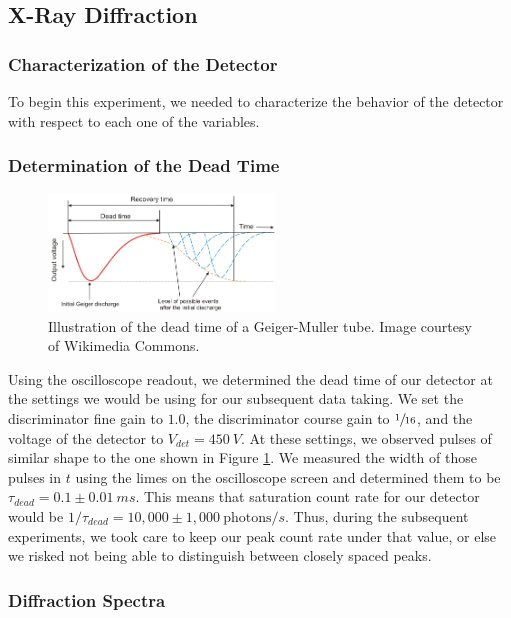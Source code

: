 \documentclass[%
 reprint,
 amsmath,amssymb,
 aps,
 pra,
]{revtex4-1}
\begin{document}
\subsection{X-Ray Diffraction}

\subsubsection{Characterization of the Detector}

To begin this experiment, we needed to characterize the behavior of the detector with respect to each one of the variables.

\subsubsection{Determination of the Dead Time}

\begin{figure}[H]
	\centering
	\includegraphics[width=6cm]{dead_time.png}
	\caption{Illustration of the dead time of a Geiger-Muller tube. Image courtesy of Wikimedia Commons.}
	\label{fig:dead_time}
\end{figure}

Using the oscilloscope readout, we determined the dead time of our detector at the settings we would be using for our subsequent data taking. We set the discriminator fine gain to $1.0$, the discriminator course gain to $\sfrac{1}{16}$, and the voltage of the detector to $V_{det} = 450~V$. At these settings, we observed pulses of similar shape to the one shown in Figure \ref{fig:dead_time}. We measured the width of those pulses in $t$ using the limes on the oscilloscope screen and determined them to be $\tau_{dead} = 0.1 \pm 0.01~ms$. This means that saturation count rate for our detector would be $1/\tau_{dead} = 10,000 \pm 1,000~\text{photons}/s$. Thus, during the subsequent experiments, we took care to keep our peak count rate under that value, or else we risked not being able to distinguish between closely spaced peaks.

\subsubsection{Diffraction Spectra}
\end{document}
